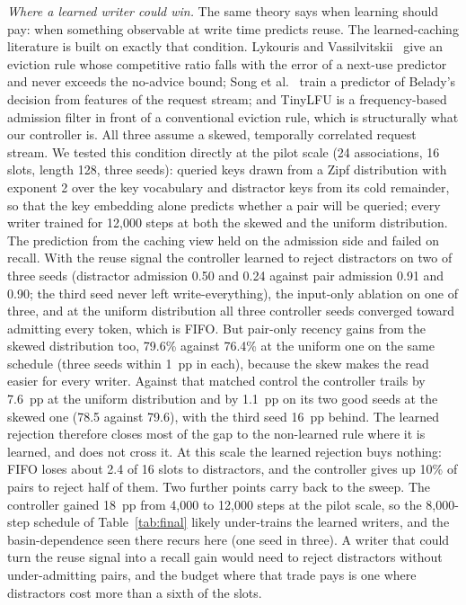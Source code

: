 \textit{Where a learned writer could win.} The same theory says when
learning should pay: when something observable at write time predicts reuse.
The learned-caching literature is built on exactly that condition. Lykouris
and Vassilvitskii~\cite{lykouris2018competitive} give an eviction rule whose
competitive ratio falls with the error of a next-use predictor and never
exceeds the no-advice bound; Song et al.~\cite{song2020lrb} train a predictor
of Belady's decision from features of the request stream; and TinyLFU
\cite{einziger2017tinylfu} is a frequency-based admission filter in front of
a conventional eviction rule, which is structurally what our controller is.
All three assume a skewed, temporally correlated request stream. We tested
this condition directly at the pilot scale (24 associations, 16 slots, length
128, three seeds): queried keys drawn from a Zipf distribution with exponent 2
over the key vocabulary and distractor keys from its cold remainder, so that
the key embedding alone predicts whether a pair will be queried; every writer
trained for 12{,}000 steps at both the skewed and the uniform distribution.
The prediction from the caching view held on the admission side and failed on
recall. With the reuse signal the controller learned to reject distractors on
two of three seeds (distractor admission 0.50 and 0.24 against pair admission
0.91 and 0.90; the third seed never left write-everything), the input-only
ablation on one of three, and at the uniform distribution all three controller
seeds converged toward admitting every token, which is FIFO. But pair-only
recency gains from the skewed distribution too, 79.6\% against 76.4\% at the
uniform one on the same schedule (three seeds within 1~pp in each), because
the skew makes the read easier for every writer. Against that matched control
the controller trails by 7.6~pp at the uniform distribution and by 1.1~pp on
its two good seeds at the skewed one (78.5 against 79.6), with the third seed
16~pp behind. The learned rejection therefore closes most of the gap to the
non-learned rule where it is learned, and does not cross it. At this scale the
learned rejection buys nothing: FIFO loses about 2.4 of 16 slots to
distractors, and the controller gives up 10\% of pairs to reject half of them.
Two further points carry back to the sweep. The controller gained 18~pp from
4{,}000 to 12{,}000 steps at the pilot scale, so the 8{,}000-step schedule of
Table~\ref{tab:final} likely under-trains the learned writers, and the
basin-dependence seen there recurs here (one seed in three). A writer that
could turn the reuse signal into a recall gain would need to reject
distractors without under-admitting pairs, and the budget where that trade
pays is one where distractors cost more than a sixth of the slots.
